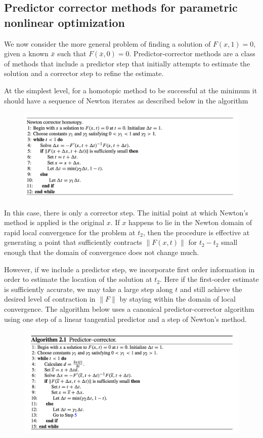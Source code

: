 \documentclass{article}
\theoremstyle{example}
\theoremstyle{definition}
\theoremstyle{assumption}
\theoremstyle{lemma}
\begin{document}
\subsection{Predictor corrector methods for parametric nonlinear optimization}
We now consider the more general problem of finding a solution of $F(x,1)=0$, given a known $\bar{x}$ such that $F(\bar{x},0)=0$.
Predictor-corrector methods are a class of methods that include a predictor step that initially attempts to estimate the solution and a corrector step to refine the estimate.
\par
At the simplest level, for a homotopic method to be successful at the minimum it should have a sequence of Newton iterates as described below in the algorithm
\begin{figure}[H]
	\centering
	\includegraphics[scale=0.6]{algo_newton_corr}
	
\end{figure}
In this case, there is only a corrector step.
The initial point at which Newton's method is applied is the original $x$.
If $x$ happens to lie in the Newton domain of rapid local convergence for the problem at $t_2$, then the procedure is effective at generating a point that sufficiently contracts $\|F(x,t)\|$ for $t_2-t_2$ small enough that the domain of convergence does not change much.
\par
However, if we include a predictor step, we incorporate first order information in order to estimate the location of the solution at $t_2$.
Here if the first-order estimate is sufficiently accurate, we may take a large step along $t$ and still achieve the desired level of contraction in $\|F\|$ by staying within the domain of local convergence.
The algorithm below uses a canonical predictor-corrector algorithm using one step of a linear tangential predictor and a step of Newton's method.
\begin{figure}[H]
	\centering
	\includegraphics[scale=0.7]{algo_newton_pred_corr}
\end{figure}
\end{document}
